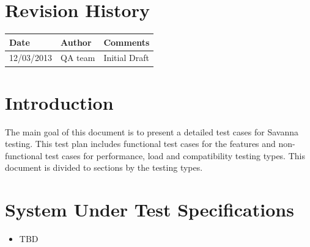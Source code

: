 \documentclass[a4paper,11pt]{article}
\begin{document}
\thispagestyle{empty}

\clearpage

\pagestyle{fancy}
\thispagestyle{fancy}

\tableofcontents

\newpage

\section{Revision History}


\begin{tabular}{|l|p{4cm}|p{10cm}|}
\hline
{\bf Date} & {\bf Author} & {\bf Comments} \\ 
\hline
12/03/2013 & QA team & Initial Draft \\ 
\hline
\end{tabular}

\section{Introduction}

The main goal of this document is to present a detailed test cases for Savanna testing. This test plan includes functional test cases for the features and non-functional test cases for performance, load and compatibility testing types. This document is divided to sections by the testing types. 


\section{System Under Test Specifications}
\begin{itemize}
\item TBD
\end{itemize}
\end{document}
